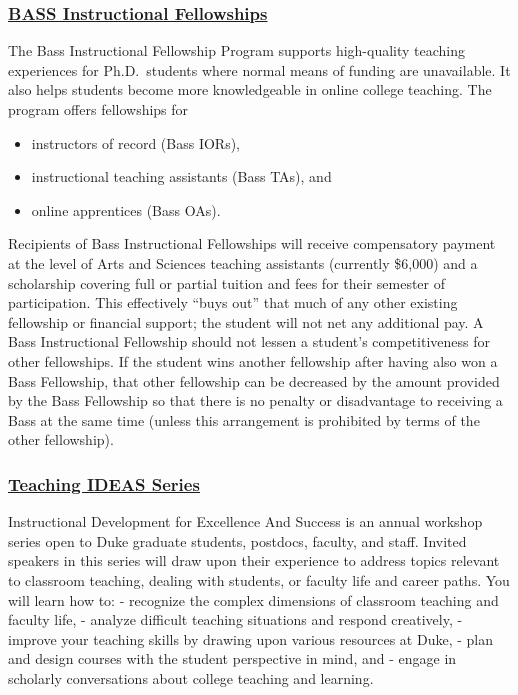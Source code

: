 \documentclass[
]{article}
\providecommand{\tightlist}{%
  \setlength{\itemsep}{0pt}\setlength{\parskip}{0pt}}
\begin{document}
\hypertarget{bass-instructional-fellowships}{%
\subsubsection{\texorpdfstring{\href{https://gradschool.duke.edu/professional-development/programs/bass-instructional-fellowships}{BASS Instructional Fellowships}}{BASS Instructional Fellowships}}\label{bass-instructional-fellowships}}

The Bass Instructional Fellowship Program supports high-quality teaching experiences for Ph.D.~students where normal means of funding are unavailable. It also helps students become more knowledgeable in online college teaching. The program offers fellowships for

\begin{itemize}
\tightlist
\item
  instructors of record (Bass IORs),
\item
  instructional teaching assistants (Bass TAs), and
\item
  online apprentices (Bass OAs).
\end{itemize}

Recipients of Bass Instructional Fellowships will receive compensatory payment at the level of Arts and Sciences teaching assistants (currently \$6,000) and a scholarship covering full or partial tuition and fees for their semester of participation. This effectively ``buys out'' that much of any other existing fellowship or financial support; the student will not net any additional pay. A Bass Instructional Fellowship should not lessen a student's competitiveness for other fellowships. If the student wins another fellowship after having also won a Bass Fellowship, that other fellowship can be decreased by the amount provided by the Bass Fellowship so that there is no penalty or disadvantage to receiving a Bass at the same time (unless this arrangement is prohibited by terms of the other fellowship).

\hypertarget{teaching-ideas-series}{%
\subsubsection{\texorpdfstring{\href{https://gradschool.duke.edu/professional-development/programs/teaching-ideas-series}{Teaching IDEAS Series}}{Teaching IDEAS Series}}\label{teaching-ideas-series}}

Instructional Development for Excellence And Success is an annual workshop series open to Duke graduate students, postdocs, faculty, and staff. Invited speakers in this series will draw upon their experience to address topics relevant to classroom teaching, dealing with students, or faculty life and career paths. You will learn how to:
- recognize the complex dimensions of classroom teaching and faculty life,
- analyze difficult teaching situations and respond creatively,
- improve your teaching skills by drawing upon various resources at Duke,
- plan and design courses with the student perspective in mind, and
- engage in scholarly conversations about college teaching and learning.
\end{document}
